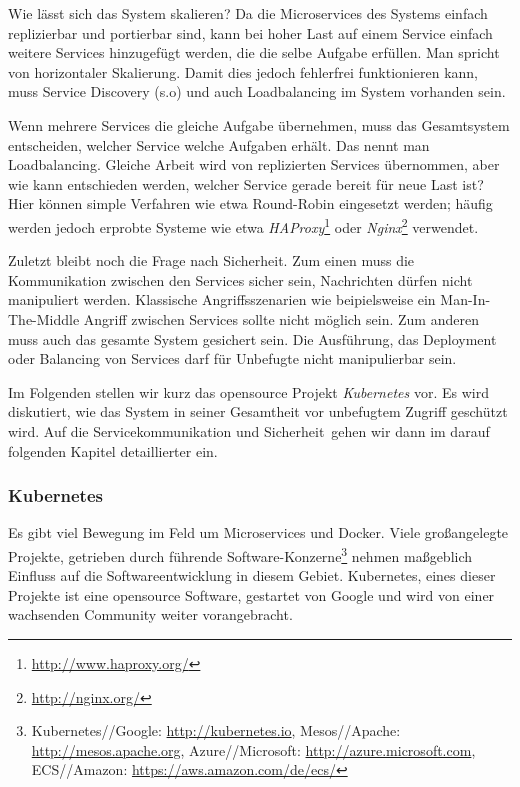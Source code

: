 Wie lässt sich das System skalieren? Da die Microservices des Systems einfach replizierbar und portierbar sind, kann bei hoher Last auf einem Service einfach weitere Services hinzugefügt werden, die die selbe Aufgabe erfüllen. Man spricht von horizontaler Skalierung. Damit dies jedoch fehlerfrei funktionieren kann, muss Service Discovery (s.o) und auch Loadbalancing im System vorhanden sein.

Wenn mehrere Services die gleiche Aufgabe übernehmen, muss das Gesamtsystem entscheiden, welcher Service welche Aufgaben erhält. Das nennt man Loadbalancing. Gleiche Arbeit wird von replizierten Services übernommen, aber wie kann entschieden werden, welcher Service gerade bereit für neue Last ist? Hier können simple Verfahren wie etwa Round-Robin eingesetzt werden; häufig werden jedoch erprobte Systeme wie etwa \textit{HAProxy}\footnote{\url{http://www.haproxy.org/}} oder \textit{Nginx}\footnote{\url{http://nginx.org/}} verwendet.

Zuletzt bleibt noch die Frage nach Sicherheit. Zum einen muss die Kommunikation zwischen den Services sicher sein, Nachrichten dürfen nicht manipuliert werden. Klassische Angriffsszenarien wie beipielsweise ein Man-In-The-Middle Angriff zwischen Services sollte nicht möglich sein. Zum anderen muss auch das gesamte System gesichert sein. Die Ausführung, das Deployment oder Balancing von Services darf für Unbefugte nicht manipulierbar sein. 

Im Folgenden stellen wir kurz das opensource Projekt \textit{Kubernetes} vor. Es wird diskutiert, wie das System in seiner Gesamtheit vor unbefugtem Zugriff geschützt wird. Auf die \glqq Servicekommunikation und Sicherheit\grqq \ gehen wir dann im darauf folgenden Kapitel detaillierter ein.

\subsubsection{Kubernetes}
Es gibt viel Bewegung im Feld um Microservices und Docker. Viele großangelegte Projekte, getrieben durch führende Software-Konzerne\footnote{Kubernetes//Google: \url{http://kubernetes.io}, Mesos//Apache: \url{http://mesos.apache.org}, Azure//Microsoft: \url{http://azure.microsoft.com}, ECS//Amazon: \url{https://aws.amazon.com/de/ecs/}} nehmen maßgeblich Einfluss auf die Softwareentwicklung in diesem Gebiet. Kubernetes, eines dieser Projekte ist eine opensource Software, gestartet von Google und wird von einer wachsenden Community weiter vorangebracht.
